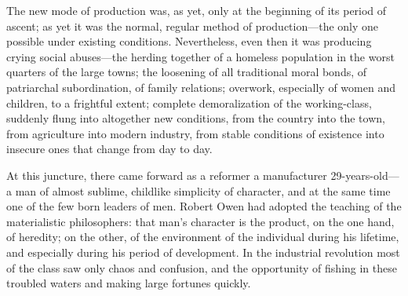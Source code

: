 The new mode of production was, as yet, only at the beginning of its period of
ascent; as yet it was the normal, regular method of production---the only one
possible under existing conditions. Nevertheless, even then it was producing
crying social abuses---the herding together of a homeless population in the
worst quarters of the large towns; the loosening of all traditional moral bonds,
of patriarchal subordination, of family relations; overwork, especially of women
and children, to a frightful extent; complete demoralization of the
working-class, suddenly flung into altogether new conditions, from the country
into the town, from agriculture into modern industry, from stable conditions of
existence into insecure ones that change from day to day.

At this juncture, there came forward as a reformer a manufacturer
29-years-old---a man of almost sublime, childlike simplicity of character, and
at the same time one of the few born leaders of men. Robert Owen had adopted the
teaching of the materialistic philosophers: that man's character is the product,
on the one hand, of heredity; on the other, of the environment of the individual
during his lifetime, and especially during his period of development. In the
industrial revolution most of the class saw only chaos and confusion, and the
opportunity of fishing in these troubled waters and making large fortunes
quickly.

\printendnotes